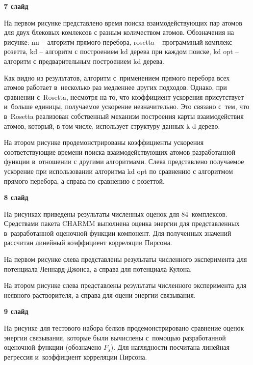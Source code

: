 \documentclass[30pt]{article}
\begin{document}
\vspace{+5mm}

\newpage

\textbf{7 слайд}

На первом рисунке представлено время поиска взаимодействующих пар атомов для двух блековых комлексов с разным количеством атомов.
Обозначения на рисунке: nn -- алгоритм прямого перебора, rosetta -- программный комплекс розетта, kd -- алгоритм с построением kd дерева при каждом поиске, kd opt -- алгоритм с предварительным построением kd дерева.

Как видно из результатов, алгоритм с~применением прямого перебора всех атомов работает в~несколько раз медленнее других подходов. Однако, при сравнении с~Rosetta, несмотря на то, что коэффициент ускорения присутствует и~больше единицы, получаемое ускорение незначительно. Это связано с~тем, что в~Rosetta реализован собственный механизм построения карты взаимодействия атомов, который, в том числе, использует структуру данных k-d-дерево.

На втором рисунке продемонстрированы коэффициенты ускорения соответствующие времени поиска взаимодействующих атомов разработанной функции в~отношении с другими алгоритмами. Слева представлено получаемое ускорение при использовании алгоритма kd opt по сравнению с алгоритмом прямого перебора, а справа по сравнению с розеттой.

\vspace{+5mm}


\textbf{8 слайд}

На рисунках приведены результаты численных оценок для 84~комплексов. Средствами пакета CHARMM выполнена оценка энергии для представленных в~разработанной оценочной функции компонент. Для полученных значений рассчитан линейный коэффициент корреляции Пирсона.

На первом рисунке слева представлены результаты численного эксперимента для потенциала Леннард-Джонса, а справа для потенциала Кулона.

На втором рисунке слева представлены результаты численного эксперимента для неявного растворителя, а справа для оцени энергии связывания.

\vspace{+5mm}


\textbf{9 слайд}

На рисунке для тестового набора белков продемонстрировано сравнение оценок энергии связывания, которые были вычислены с~помощью разработанной оценочной функции (обозначено $F_s$). Для наглядности посчитана линейная регрессия и~коэффициент корреляции Пирсона.
\end{document}
